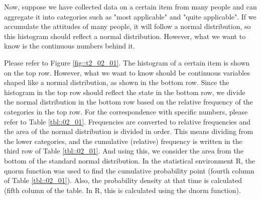 \documentclass{ltjsbook}
\begin{document}
Now, suppose we have collected data on a certain item from many people and can aggregate it into categories such as "most applicable" and "quite applicable". If we accumulate the attitudes of many people, it will follow a normal distribution, so this histogram should reflect a normal distribution. However, what we want to know is the continuous numbers behind it.



Please refer to Figure \ref{fig::t2_02_01}. The histogram of a certain item is shown on the top row. However, what we want to know should be continuous variables shaped like a normal distribution, as shown in the bottom row. Since the histogram in the top row should reflect the state in the bottom row, we divide the normal distribution in the bottom row based on the relative frequency of the categories in the top row. For the correspondence with specific numbers, please refer to Table \ref{tbl::02_01}. Frequencies are converted to relative frequencies and the area of the normal distribution is divided in order. This means dividing from the lower categories, and the cumulative (relative) frequency is written in the third row of Table \ref{tbl::02_01}. And using this, we consider the area from the bottom of the standard normal distribution. In the statistical environment R, the qnorm function was used to find the cumulative probability point (fourth column of Table \ref{tbl::02_01}). Also, the probability density at that time is calculated (fifth column of the table. In R, this is calculated using the dnorm function).
\end{document}
